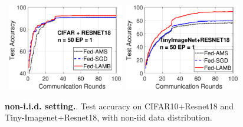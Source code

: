 \documentclass{article}
\begin{document}
\begin{figure}[H]
    \begin{center}
        \mbox{
        \hspace{-0.05in}\includegraphics[width=0.45\textwidth]{fig/cifar_testerror_resnet18_ep1_client2_iid0.eps}
        \hspace{-0.1in}\includegraphics[width=0.45\textwidth]{fig/tinyimagenet_testerror_resnet18_ep1_client2_iid0bis.eps}
        }
    \end{center}
	\caption{\textbf{non-i.i.d. setting.}. Test accuracy on CIFAR10+Resnet18 and Tiny-Imagenet+Resnet18, with non-iid data distribution.
	}
	\label{fig:noniidresnet18}
\end{figure}



\begin{table}[H]
\small
\caption{ Test Accuracies for larger models.}\label{tab:acc}
\end{table}




\end{document}
